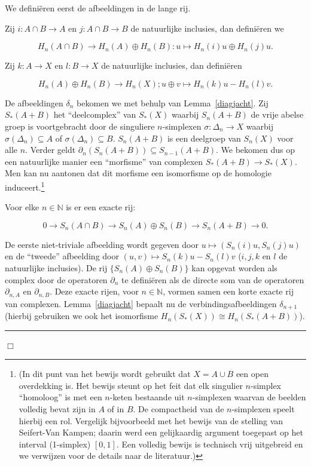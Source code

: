 \documentclass[12pt]{book}
\newcommand{\N}{\mathbb{N}}
\newcommand{\B}{\rule{1mm}{0mm} \hfill $\Box$ }
\begin{document}
We defini\"eren eerst de afbeeldingen in de lange rij.

Zij $i:A\cap B\to A$ en $j:A\cap B\to B$ de natuurlijke inclusies, dan defini\"{e}ren we

$$H_{n}(A\cap B)\to H_{n}(A)\oplus H_{n}(B): u\mapsto H_{n}(i)u\oplus  H_{n}(j)u.$$

Zij $k:A\to X$ en $l:B\to X$ de natuurlijke inclusies, dan defini\"{e}ren

$$H_{n}(A)\oplus H_{n}(B)\to H_{n}(X); u\oplus v\mapsto H_{n}(k)u-H_{n}(l)v.$$

De afbeeldingen $\delta_{n}$ bekomen we met behulp van  Lemma~\ref{diagjacht}.
Zij $S_{*}(A+B)$ het ``deelcomplex'' van $S_{*}(X)$ waarbij $S_{n}(A+B)$
de vrije abelse groep is voortgebracht door de singuliere $n$-simplexen $\sigma:\Delta_{n}\to X$
waarbij $\sigma(\Delta_{n})\subseteq A$ of $\sigma(\Delta_{n})\subseteq B$. $S_{n}(A+B)$ is een
deelgroep van $S_{n}(X)$ voor alle $n$. Verder geldt $\partial_{n}(S_{n}(A+B))\subseteq
S_{n-1}(A+B)$. We bekomen dus op een natuurlijke manier een ``morfisme'' van complexen $S_{*}(A+B)\to
S_{*}(X)$. Men kan nu aantonen dat dit morfisme een isomorfisme op de homologie induceert.\footnote{(In dit punt van het bewijs wordt gebruikt dat $X=A\cup B$ een open overdekking is. Het bewijs steunt op het feit dat elk singulier $n$-simplex ``homoloog'' is met een $n$-keten bestaande uit $n$-simplexen waarvan de beelden volledig
bevat zijn in $A$ of in $B$. De compactheid van de $n$-simplexen speelt hierbij een rol. Vergelijk bijvoorbeeld met het bewijs van de stelling van Seifert-Van Kampen; daarin werd een gelijkaardig argument toegepast op het interval (1-simplex) $[0,1]$. Een volledig bewijs is technisch vrij uitgebreid en we
verwijzen voor de details naar de literatuur.)}

Voor elke $n\in \N$ is er een exacte rij:

$$0\to S_{n}(A\cap B)\to S_{n}(A)\oplus S_{n}(B) \to S_{n}(A+B) \to 0.$$

De eerste niet-triviale afbeelding wordt gegeven door $u\mapsto (S_{n}(i)u, S_{n}(j)u)$ en de ``tweede'' afbeelding
door $(u,v)\mapsto S_{n}(k)u-S_{n}(l)v$ ($i,j,k$ en $l$ de natuurlijke inclusies). De rij
$\{S_{n}(A)\oplus S_{n}(B)\}$ kan opgevat worden als complex door de operatoren $\partial_{n}$ te
defini\"eren als de directe som van de operatoren $\partial_{n,A}$ en $\partial_{n,B}$. Deze exacte rijen, voor $n \in \mathbb{N}$, 
vormen samen een korte exacte rij van complexen. Lemma~\ref{diagjacht} bepaalt nu de verbindingsafbeeldingen $\delta_{n+1}$
(hierbij gebruiken we ook het isomorfisme $H_{n}(S_{*}(X))\cong H_{n}(S_{*}(A+B))$).
\B
\end{document}
